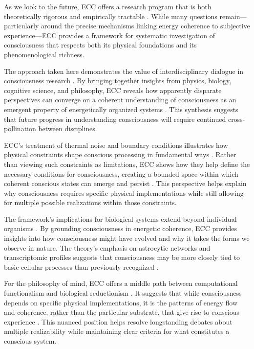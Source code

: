 As we look to the future, ECC offers a research program that is both theoretically rigorous and empirically tractable \cite{seth2021being}. While many questions remain—particularly around the precise mechanisms linking energy coherence to subjective experience—ECC provides a framework for systematic investigation of consciousness that respects both its physical foundations and its phenomenological richness.

The approach taken here demonstrates the value of interdisciplinary dialogue in consciousness research \cite{deacon2011incomplete}. By bringing together insights from physics, biology, cognitive science, and philosophy, ECC reveals how apparently disparate perspectives can converge on a coherent understanding of consciousness as an emergent property of energetically organized systems \cite{koch2019feeling}. This synthesis suggests that future progress in understanding consciousness will require continued cross-pollination between disciplines.

ECC's treatment of thermal noise and boundary conditions illustrates how physical constraints shape conscious processing in fundamental ways \cite{rovelli2018order}. Rather than viewing such constraints as limitations, ECC shows how they help define the necessary conditions for consciousness, creating a bounded space within which coherent conscious states can emerge and persist \cite{penrose2016fashion}. This perspective helps explain why consciousness requires specific physical implementations while still allowing for multiple possible realizations within those constraints.

The framework's implications for biological systems extend beyond individual organisms \cite{rosen2012anticipatory}. By grounding consciousness in energetic coherence, ECC provides insights into how consciousness might have evolved and why it takes the forms we observe in nature. The theory's emphasis on astrocytic networks and transcriptomic profiles suggests that consciousness may be more closely tied to basic cellular processes than previously recognized \cite{thompson2014waking}.

For the philosophy of mind, ECC offers a middle path between computational functionalism and biological reductionism \cite{langer2009philosophy}. It suggests that while consciousness depends on specific physical implementations, it is the patterns of energy flow and coherence, rather than the particular substrate, that give rise to conscious experience \cite{varela2016embodied}. This nuanced position helps resolve longstanding debates about multiple realizability while maintaining clear criteria for what constitutes a conscious system.

